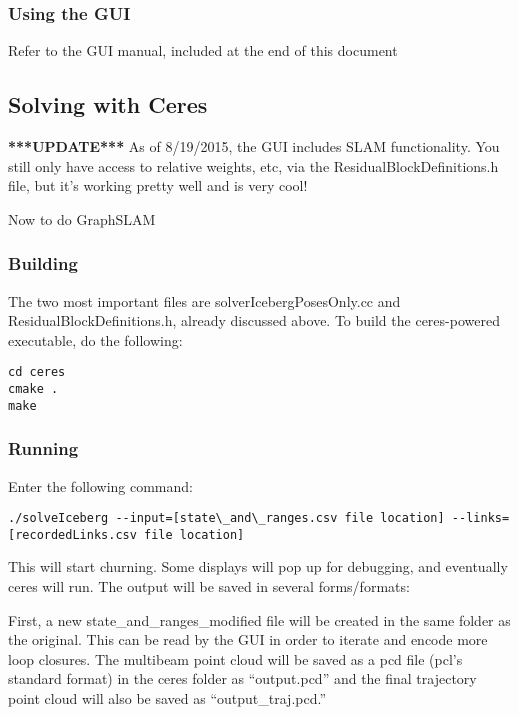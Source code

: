 \documentclass[12pt]{amsart}
\begin{document}
\subsubsection{Using the GUI}

Refer to the GUI manual, included at the end of this document

\subsection{Solving with Ceres}

\textbf{***UPDATE***} As of 8/19/2015, the GUI includes SLAM functionality. You still only have access to relative weights, etc, via the ResidualBlockDefinitions.h file, but it's working pretty well and is very cool!

Now to do GraphSLAM
\subsubsection{Building}

The two most important files are solverIcebergPosesOnly.cc and ResidualBlockDefinitions.h, already discussed above. To build the ceres-powered executable, do the following:

\begin{lstlisting}
cd ceres
cmake .
make
\end{lstlisting} 



\subsubsection{Running} Enter the following command:
\begin{tiny}
\begin{lstlisting}
./solveIceberg --input=[state\_and\_ranges.csv file location] --links=[recordedLinks.csv file location]
\end{lstlisting} 
\end{tiny}
This will start churning. Some displays will pop up for debugging, and eventually ceres will run. The output will be saved in several forms/formats:

First, a new state\_and\_ranges\_modified file will be created in the same folder as the original. This can be read by the GUI in order to iterate and encode more loop closures. The multibeam point cloud will be saved as a pcd file (pcl's standard format) in the ceres folder as ``output.pcd'' and the final trajectory point cloud will also be saved as ``output\_traj.pcd.''


\end{document}
